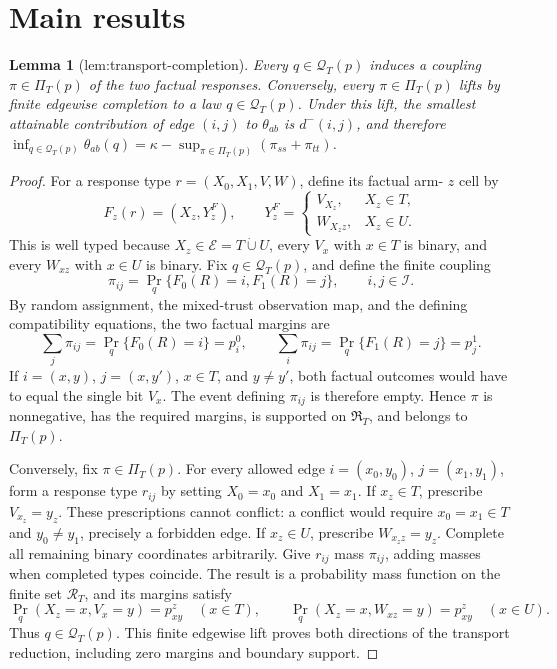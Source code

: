 \documentclass{article}
\newtheorem{lemma}{Lemma}
\begin{document}
\section{Main results}

\begin{lemma}[lem:transport-completion]\label{lem:transport-completion}
Every \(q\in\mathcal Q_T(p)\) induces a coupling \(\pi\in\Pi_T(p)\) of the two factual responses. Conversely, every \(\pi\in\Pi_T(p)\) lifts by finite edgewise completion to a law \(q\in\mathcal Q_T(p)\). Under this lift, the smallest attainable contribution of edge \((i,j)\) to \(\theta_{ab}\) is \(d^-(i,j)\), and therefore \(\inf_{q\in\mathcal Q_T(p)}\theta_{ab}(q)=\kappa-\sup_{\pi\in\Pi_T(p)}(\pi_{ss}+\pi_{tt})\).
\end{lemma}
\begin{proof}
For a response type \(r=(X_0,X_1,V,W)\), define its factual arm-
\(z\) cell by
\[
 F_z(r)=(X_z,Y_z^F),\qquad
 Y_z^F=\begin{cases}
 V_{X_z},&X_z\in T,\\
 W_{X_z z},&X_z\in U.
 \end{cases}
\]
This is well typed because \(X_z\in\mathcal E=T\mathbin{\dot\cup}U\), every
\(V_x\) with \(x\in T\) is binary, and every \(W_{xz}\) with \(x\in U\)
is binary.  Fix \(q\in\mathcal Q_T(p)\), and define the finite coupling
\[
 \pi_{ij}=\Pr_q\{F_0(R)=i,F_1(R)=j\},\qquad i,j\in\mathcal I.
\]
By random assignment, the mixed-trust observation map, and the defining
compatibility equations, the two factual margins are
\[
 \sum_j\pi_{ij}=\Pr_q\{F_0(R)=i\}=p_i^0,
 \qquad
 \sum_i\pi_{ij}=\Pr_q\{F_1(R)=j\}=p_j^1.
\]
If \(i=(x,y)\), \(j=(x,y')\), \(x\in T\), and \(y\ne y'\), both factual
outcomes would have to equal the single bit \(V_x\).  The event defining
\(\pi_{ij}\) is therefore empty.  Hence \(\pi\) is nonnegative, has the
required margins, is supported on \(\mathfrak R_T\), and belongs to
\(\Pi_T(p)\).

Conversely, fix \(\pi\in\Pi_T(p)\).  For every allowed edge
\(i=(x_0,y_0)\), \(j=(x_1,y_1)\), form a response type \(r_{ij}\) by setting
\(X_0=x_0\) and \(X_1=x_1\).  If \(x_z\in T\), prescribe
\(V_{x_z}=y_z\).  These prescriptions cannot conflict: a conflict would
require \(x_0=x_1\in T\) and \(y_0\ne y_1\), precisely a forbidden edge.
If \(x_z\in U\), prescribe \(W_{x_z z}=y_z\).  Complete all remaining
binary coordinates arbitrarily.  Give \(r_{ij}\) mass \(\pi_{ij}\), adding
masses when completed types coincide.  The result is a probability mass
function on the finite set \(\mathcal R_T\), and its margins satisfy
\[
 \Pr_q(X_z=x,V_x=y)=p^z_{xy}\quad(x\in T),
 \qquad
 \Pr_q(X_z=x,W_{xz}=y)=p^z_{xy}\quad(x\in U).
\]
Thus \(q\in\mathcal Q_T(p)\).  This finite edgewise lift proves both
directions of the transport reduction, including zero margins and boundary
support.


\end{proof}
\end{document}
